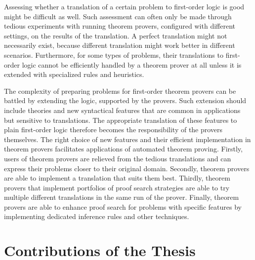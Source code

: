 Assessing whether a translation of a certain problem to first-order logic is good might be difficult as well. Such assessment can often only be made through tedious experiments with running theorem provers, configured with different settings, on the results of the translation. A perfect translation might not necessarily exist, because different translation might work better in different scenarios. Furthermore, for some types of problems, their translations to first-order logic cannot be efficiently handled by a theorem prover at all unless it is extended with specialized rules and heuristics.

The complexity of preparing problems for first-order theorem provers can be battled by extending the logic, supported by the provers. Such extension should include theories and new syntactical features that are common in applications but sensitive to translations. The appropriate translation of these features to plain first-order logic therefore becomes the responsibility of the provers themselves. The right choice of new features and their efficient implementation in theorem provers facilitates applications of automated theorem proving. Firstly, users of theorem provers are relieved from the tedious translations and can express their problems closer to their original domain. Secondly, theorem provers are able to implement a translation that suits them best. Thirdly, theorem provers that implement portfolios of proof search strategies are able to try multiple different translations in the same run of the prover. Finally, theorem provers are able to enhance proof search for problems with specific features by implementing dedicated inference rules and other techniques.


\section*{Contributions of the Thesis}
\label{sect:intro:contributions}


